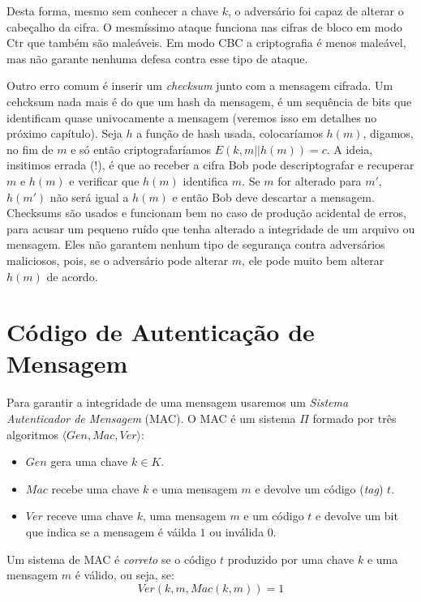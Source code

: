 Desta forma, mesmo sem conhecer a chave $k$, o adversário foi capaz de alterar o cabeçalho da cifra.
O mesmíssimo ataque funciona nas cifras de bloco em modo Ctr que também são maleáveis.
Em modo CBC a criptografia é menos maleável, mas não garante nenhuma defesa contra esse tipo de ataque.

Outro erro comum é inserir um {\em checksum} junto com a mensagem cifrada.
Um cehcksum nada mais é do que um hash da mensagem, é um sequência de bits que identificam quase univocamente a mensagem (veremos isso em detalhes no próximo capítulo).
Seja $h$ a função de hash usada, colocaríamos $h(m)$, digamos, no fim de $m$ e só então criptografaríamos $E(k, m||h(m)) = c$.
A ideia, insitimos errada (!), é que ao receber a cifra Bob pode descriptografar e recuperar $m$ e $h(m)$ e verificar que $h(m)$ identifica $m$.
Se $m$ for alterado para $m'$, $h(m')$ não será igual a $h(m)$ e então Bob deve descartar a mensagem.
Checksums são usados e funcionam bem no caso de produção acidental de erros, para acusar um pequeno ruído que tenha alterado a integridade de um arquivo ou mensagem.
Eles não garantem nenhum tipo de segurança contra adversários maliciosos, pois, se o adversário pode alterar $m$, ele pode muito bem alterar $h(m)$ de acordo.


\section{Código de Autenticação de Mensagem}
\label{sec:mac}

Para garantir a integridade de uma mensagem usaremos um {\em Sistema Autenticador de Mensagem} (MAC).
O MAC é um sistema $\Pi$ formado por três algoritmos $\langle Gen, Mac, Ver \rangle$:
\begin{itemize}
\item $Gen$ gera uma chave $k \in K$.
\item $Mac$ recebe uma chave $k$ e uma mensagem $m$ e devolve um código ({\em tag}) $t$.
\item $Ver$ receve uma chave $k$, uma mensagem $m$ e um código $t$ e devolve um bit que indica se a mensagem é váilda $1$ ou inválida $0$.
\end{itemize}

Um sistema de MAC é {\em correto} se o código $t$ produzido por uma chave $k$ e uma mensagem $m$ é válido, ou seja, se:
\begin{displaymath}
  Ver(k, m, Mac(k,m)) = 1
\end{displaymath}

